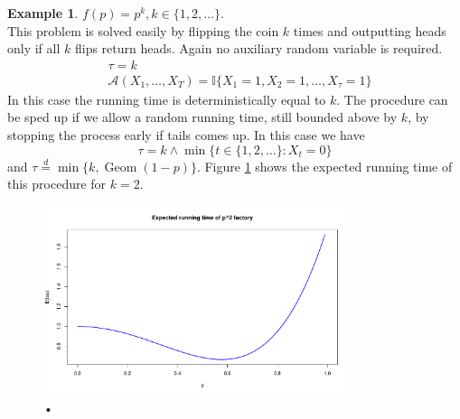 \documentclass{article}
\theoremstyle{definition}
\newtheorem{example}{Example}
\newcommand{\eqdist}{\overset{d}{=}}
\newcommand{\Geom}{\operatorname{Geom}}
\newcommand{\A}{\mathcal{A}}
\begin{document}
\begin{example}
$f(p) = p^k, k\in\{1,2,\dots\}$.\\
This problem is solved easily by flipping the coin $k$ times and outputting heads only if all $k$ flips return heads. Again no auxiliary random variable is required.
\begin{align*}
& \tau = k \\
& \A(X_1,\dots,X_T) = \mathbb{I}\{X_1 =1, X_2=1 ,\dots,X_\tau=1\}
\end{align*}
In this case the running time is deterministically equal to $k$. The procedure can be sped up if we allow a random running time, still bounded above by $k$, by stopping the process early if tails comes up. In this case we have
\begin{equation*}
\tau = k \wedge \min\{t \in \{1,2,\dots\}:X_t=0 \}
\end{equation*}
and $\tau \eqdist \min\{k, \Geom(1-p)\}$.
Figure \ref{fig:p2_runtime} shows the expected running time of this procedure for $k=2$.
\begin{figure}
\centering
\includegraphics[width=0.8\textwidth]{p2_runtime.pdf}
\caption{•}\label{fig:p2_runtime}
\end{figure}
\end{example}






\end{document}
